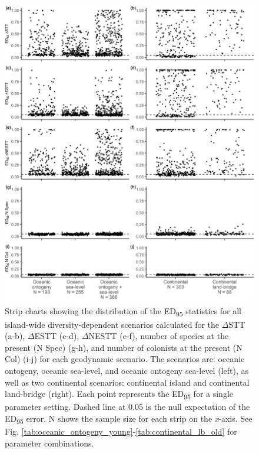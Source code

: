 \begin{figure}
    \centering
    \includegraphics[width=\textwidth]{facet_scenario_iw.png}
    \caption{Strip charts showing the distribution of the ED\textsubscript{95} statistics for all island-wide diversity-dependent scenarios calculated for the $\Delta$STT (a-b), $\Delta$ESTT (c-d), $\Delta$NESTT (e-f), number of species at the present (N Spec) (g-h), and number of colonists at the present (N Col) (i-j) for each geodynamic scenario. The scenarios are: oceanic ontogeny, oceanic sea-level, and oceanic ontogeny sea-level (left), as well as two continental scenarios: continental island and continental land-bridge (right). Each point represents the ED\textsubscript{95} for a single parameter setting. Dashed line at 0.05 is the null expectation of the ED\textsubscript{95} error. N shows the sample size for each strip on the \textit{x}-axis. See Fig. \ref{tab:oceanic_ontogeny_young}-\ref{tab:continental_lb_old} for parameter combinations.}
    \label{fig:facet_scenario_iw}
\end{figure}

